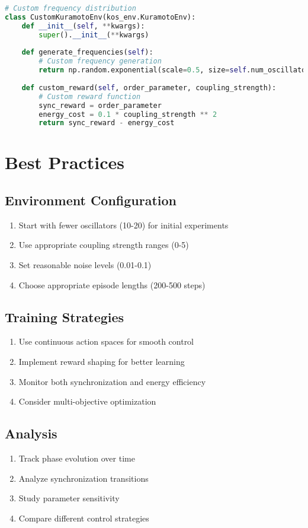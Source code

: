 \begin{lstlisting}[language=python, caption=Custom Extensions]
# Custom frequency distribution
class CustomKuramotoEnv(kos_env.KuramotoEnv):
    def __init__(self, **kwargs):
        super().__init__(**kwargs)
    
    def generate_frequencies(self):
        # Custom frequency generation
        return np.random.exponential(scale=0.5, size=self.num_oscillators)
    
    def custom_reward(self, order_parameter, coupling_strength):
        # Custom reward function
        sync_reward = order_parameter
        energy_cost = 0.1 * coupling_strength ** 2
        return sync_reward - energy_cost
\end{lstlisting}

\section{Best Practices}

\subsection{Environment Configuration}

\begin{enumerate}
    \item Start with fewer oscillators (10-20) for initial experiments
    \item Use appropriate coupling strength ranges (0-5)
    \item Set reasonable noise levels (0.01-0.1)
    \item Choose appropriate episode lengths (200-500 steps)
\end{enumerate}

\subsection{Training Strategies}

\begin{enumerate}
    \item Use continuous action spaces for smooth control
    \item Implement reward shaping for better learning
    \item Monitor both synchronization and energy efficiency
    \item Consider multi-objective optimization
\end{enumerate}

\subsection{Analysis}

\begin{enumerate}
    \item Track phase evolution over time
    \item Analyze synchronization transitions
    \item Study parameter sensitivity
    \item Compare different control strategies
\end{enumerate} 